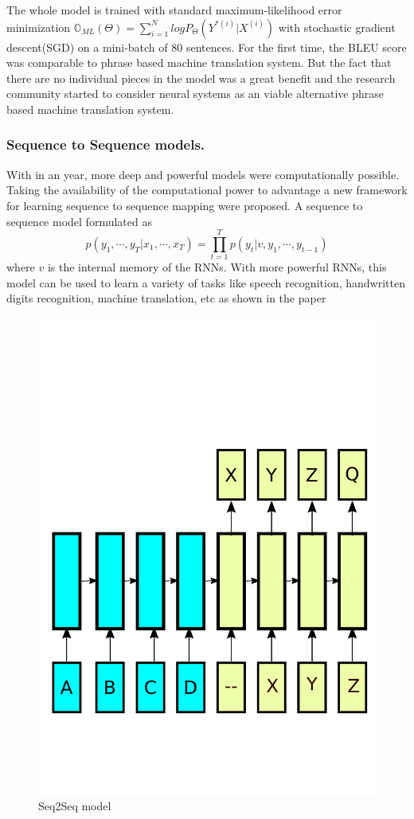\documentclass[conference]{IEEEtran}
\begin{document}
The whole model is trained with standard maximum-likelihood error minimization $\mathbb{O}_{ML}(\Theta) = \sum_{i=1}^N log P_\Theta(Y^{*(i)} | X^{(i)}) $ with stochastic gradient descent(SGD) on a mini-batch of 80 sentences. For the first time, the BLEU score was comparable to phrase based machine translation system. But the fact that there are no individual pieces in the model was a great benefit and the research community started to consider neural systems as an viable alternative phrase based machine translation system.


\subsubsection{Sequence to Sequence models.} \label{sec:seq}
With in an year, more deep and powerful models were computationally possible. Taking the availability of the computational power to advantage a new framework for learning sequence to sequence mapping were proposed. A sequence to sequence model formulated as 
$$ p(y_1, \cdots, y_T| x_1, \cdots, x_T) = \prod_{t=1}^{T} p(y_t| v, y_1, \cdots, y_{t-1})$$
where $v$ is the internal memory of the RNNs. With more powerful RNNs, this model can be used to learn a variety of tasks like speech recognition, handwritten digits recognition, machine translation, etc as shown in the paper \cite{sutskever2014sequence}


 \begin{figure}
 \centering
      \includegraphics[width=.49\linewidth]{img/seq2seq.pdf} 
	\caption{ Seq2Seq model}
	\label{fig:seq}
\end{figure}
\end{document}

